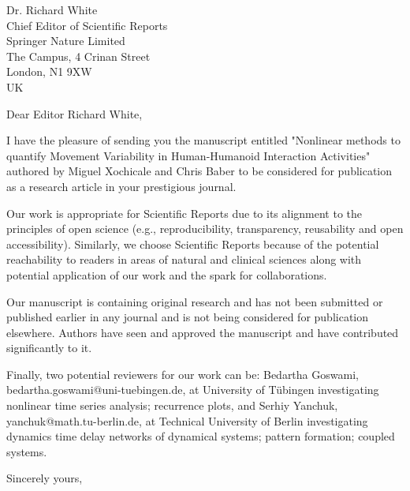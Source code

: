 \documentclass[10pt]{letter}
\begin{document}
\begin{letter}{Dr. Richard White \\
Chief Editor of Scientific Reports \\
Springer Nature Limited \\
The Campus, 4 Crinan Street\\
London, N1 9XW \\
UK
}
\opening{Dear Editor Richard White,}

I have the pleasure of sending you the manuscript entitled "Nonlinear methods to quantify Movement Variability in Human-Humanoid Interaction Activities" authored by Miguel Xochicale and Chris Baber to be considered for publication as a research article in your prestigious journal.

Our work is appropriate for Scientific Reports due to its alignment to the principles of open science (e.g., reproducibility, transparency, reusability and open accessibility).   
Similarly, we choose Scientific Reports because of the potential reachability to readers in areas of natural and clinical sciences along with potential application of our work and the spark for collaborations.

Our manuscript is containing original research and has not been submitted or published earlier in any journal and is not being considered for publication elsewhere.   
Authors have seen and approved the manuscript and have contributed significantly to it.

Finally, two potential reviewers for our work can be: Bedartha Goswami, bedartha.goswami@uni-tuebingen.de, at University of Tübingen investigating nonlinear time series analysis; recurrence plots, and Serhiy Yanchuk, yanchuk@math.tu-berlin.de, at Technical University of Berlin investigating dynamics time delay networks of dynamical systems; pattern formation; coupled systems.  


\closing{Sincerely yours,}


\end{letter}
\end{document}
